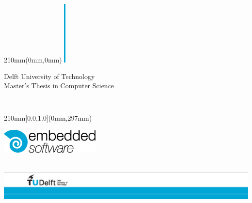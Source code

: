 
\begin {textblock*}{210mm}(0mm,0mm)
\noindent
\includegraphics[height=3.2cm]{pics/block}
\sffamily
\vspace{.8cm}
\begin{center}
\Large
Delft University of Technology\\
Master's Thesis in Computer Science\\
\vspace{2cm}
\parbox{170mm}{\bfseries\centering\Huge\reportTitle}\\
\vspace{1cm}
\parbox{170mm}{\bfseries\centering\reportAuthor}

\end{center}
\end{textblock*}

\begin {textblock*}{210mm}[0.0,1.0](0mm,297mm)
\noindent
\hspace{1.89cm}


\hfill\parbox{5cm}{
\includegraphics[width=5cm]{pics/es_logo_cyan_black_rgb}}
\hspace*{2cm}\\

\vspace*{1.5cm}
\noindent
\includegraphics[width=\textwidth]{pics/TU_border_A4_L_front}
\end{textblock*}

\null\newpage
